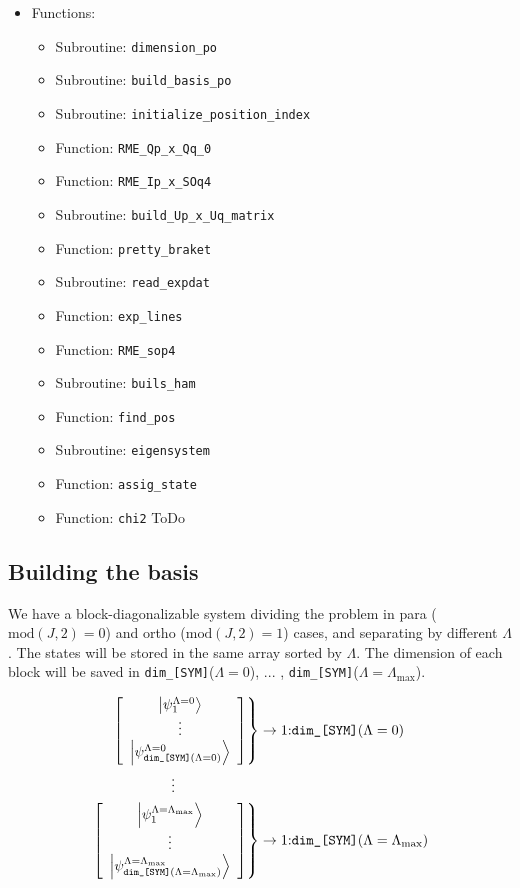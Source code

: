 \documentclass[english,twoside, openright]{report}
\begin{document}
\begin{itemize}
\begin{itemize}
  \end{itemize}
\item Functions:
  \begin{itemize}
  \item Subroutine: \texttt{dimension\_po}
  \item Subroutine: \texttt{build\_basis\_po}
  \item Subroutine: \texttt{initialize\_position\_index}
  \item Function: \texttt{RME\_Qp\_x\_Qq\_0}
  \item Function: \texttt{RME\_Ip\_x\_SOq4}
  \item Subroutine: \texttt{build\_Up\_x\_Uq\_matrix}
  \item Function: \texttt{pretty\_braket}
  \item Subroutine: \texttt{read\_expdat}
  \item Function: \texttt{exp\_lines}
  \item Function: \texttt{RME\_sop4}
  \item Subroutine: \texttt{buils\_ham}
  \item Function: \texttt{find\_pos}
  \item Subroutine: \texttt{eigensystem}
  \item Function: \texttt{assig\_state}
  \item Function: \texttt{chi2} ToDo
  \end{itemize}
\end{itemize}

\subsection{Building the basis}

We have a block-diagonalizable system dividing the problem in para
($\text{mod}(J,2)=0$) and ortho ($\text{mod}(J,2)=1$) cases, and
separating by different $\Lambda$. The states will be stored in the
same array sorted by $\Lambda$. The dimension of each block will be
saved in \texttt{dim\_[SYM]}($\Lambda=0$), ... ,
\texttt{dim\_[SYM]}($\Lambda=\Lambda_{\text{max}}$).

\begin{align}
  \left.\left[
  \begin{array}{c}
    \ket{\psi_{1}^{\Lambda=0} }\\
    \vdots \\
    \ket{\psi_{\text{\texttt{dim\_[SYM]}}(\Lambda=0)}^{\Lambda=0}}
  \end{array}
  \right]\right\}& \rightarrow \text{1:\texttt{dim\_[SYM]}}(\Lambda=0)
  \nonumber\\
  \vdots  \qquad \qquad \qquad &
  \\
  \left.\left[
  \begin{array}{c}
    \ket{\psi_{1}^{\Lambda=\Lambda_{\text{max}}} }\\
    \vdots \\
    \ket{\psi_{\text{\texttt{dim\_[SYM]}}(\Lambda=\Lambda_{\text{max}})}^{\Lambda=\Lambda_{\text{max}}}}
  \end{array}
  \right]\right\}& \rightarrow \text{1:\texttt{dim\_[SYM]}}(\Lambda=\Lambda_{\text{max}}) \nonumber
\end{align}
\end{document}
